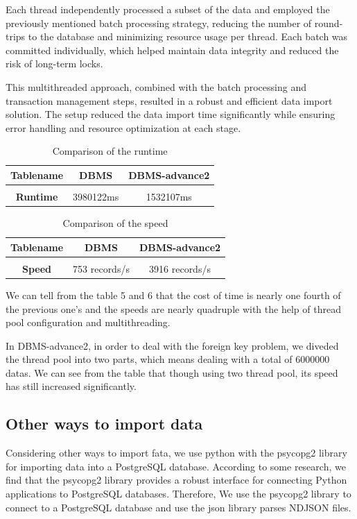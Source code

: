 \documentclass{article}
\begin{document}
Each thread independently processed a subset of the data and employed the previously mentioned batch processing strategy, reducing the number of round-trips to the database and minimizing resource usage per thread. Each batch was committed individually, which helped maintain data integrity and reduced the risk of long-term locks.

This multithreaded approach, combined with the batch processing and transaction management steps, resulted in a robust and efficient data import solution. The setup reduced the data import time significantly while ensuring error handling and resource optimization at each stage.


\begin{table}[h!]
\centering
 \begin{tabular}{c c c}
 \hline
 \textbf{Tablename} & DBMS & DBMS-advance2 \\ [0.1ex] 
 \hline 
 \\[0.00000000001ex]
 \textbf{Runtime} & 3980122ms & 1532107ms \\ [2.7ex]
 \hline
 \end{tabular}
 \caption{Comparison of the runtime}
\end{table}
\begin{table}[h!]
\centering
 \begin{tabular}{c c c}
 \hline
 \textbf{Tablename} & DBMS & DBMS-advance2 \\ [0.1ex] 
 \hline 
 \\[0.00000000001ex]
 \textbf{Speed} & 753 records/s & 3916 records/s \\ [2.7ex]
 \hline
 \end{tabular}
 \caption{Comparison of the speed}
\end{table}

We can tell from the table 5 and 6 that the cost of time is nearly one fourth of the previous one’s and the speeds are nearly quadruple with the help of thread pool configuration and multithreading. 

In DBMS-advance2, in order to deal with the foreign key problem, we diveded the thread pool into two parts, which means dealing with a total of 6000000 datas. We can see from the table that though using two thread pool, its speed has still increased significantly.


\subsection{Other ways to import data}
Considering other ways to import fata, we use python with the psycopg2 library for importing data into a PostgreSQL database. According to some research, we find that the psycopg2 library provides a robust interface for connecting Python applications to PostgreSQL databases. Therefore, We use the psycopg2 library to connect to a PostgreSQL database and use the json library parses NDJSON files.
\end{document}
